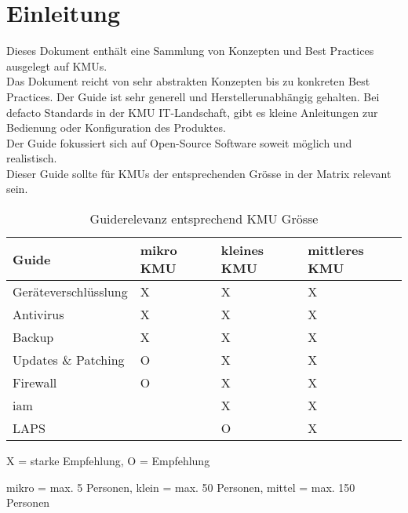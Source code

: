 \chapter{Einleitung}
Dieses Dokument enthält eine Sammlung von Konzepten und Best Practices ausgelegt auf KMUs.\\

Das Dokument reicht von sehr abstrakten Konzepten bis zu konkreten Best Practices.
Der Guide ist sehr generell und Herstellerunabhängig gehalten.
Bei defacto Standards in der KMU IT-Landschaft, gibt es kleine Anleitungen zur Bedienung oder Konfiguration des Produktes.\\

Der Guide fokussiert sich auf Open-Source Software soweit möglich und realistisch.\\

Dieser Guide sollte für KMUs der entsprechenden Grösse in der Matrix relevant sein.

\begin{table}[H]
    \begin{center}
        \begin{tabular}{l|l|l|l}
            Guide                & mikro KMU & kleines KMU & mittleres KMU\\
            \hline
            Geräteverschlüsslung & X         & X             & X\\
            Antivirus            & X         & X             & X\\
            Backup               & X         & X             & X\\
            Updates \& Patching  & O         & X             & X\\
            Firewall             & O         & X             & X\\
            \acrshort{iam}       &           & X             & X\\
            LAPS                 &           & O             & X\\
        \end{tabular}
        \caption*{X = starke Empfehlung, O = Empfehlung}
        \vspace{-3mm}
        \caption*{mikro = max. 5 Personen, klein = max. 50 Personen, mittel = max. 150 Personen}
    \end{center}
    \caption{Guiderelevanz entsprechend KMU Grösse}
\end{table}